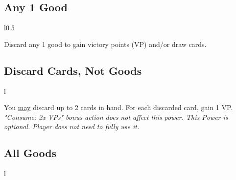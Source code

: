 \documentclass[letterpaper,landscape,twocolumn,8pt]{extarticle}
\begin{document}
\begin{minipage}[t]{0.31\columnwidth}
\setlength{\intextsep}{0pt}%



\subsection*{Any 1 Good}
\begin{wrapfigure}{l}{0.5\columnwidth}
    ~
    \smallbreak{}
    ~
    \smallbreak{}
    
\end{wrapfigure}

Discard any 1 good to gain victory points (VP) and/or draw cards.
\hfill{}\\
\subsection*{\RaggedRight{}Discard Cards, Not Goods}
\begin{wrapfigure}{l}{\columnwidth}
    
\end{wrapfigure}

You \underline{may} discard up to 2 cards in hand. For each discarded card, gain
1 VP.
\smallbreak{}
\textit{"Consume: 2x VPs" bonus action does not affect this power. This Power is
optional. Player does not need to fully use it.}
\subsection*{All Goods}
\begin{wrapfigure}{l}{\columnwidth}
    
\end{wrapfigure}


\end{minipage}
\end{document}
